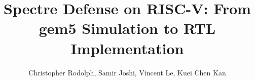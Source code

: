 \documentclass[sigplan,screen,10pt]{acmart}
\begin{document}
\setlength{\emergencystretch}{1em}

\title{Spectre Defense on RISC-V: From gem5 Simulation to RTL Implementation}

\author{Christopher Rodolph, Samir Joshi, Vincent Le, Kuei Chen Kan}



\maketitle













\end{document}
